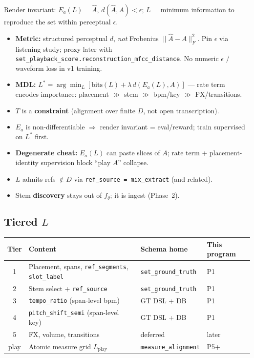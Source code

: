 \documentclass[11pt,a4paper]{article}
\begin{document}
\noindent Render invariant: $E_a(L)=\hat{A}$, $d(\hat{A},A)<\epsilon$; $L$ = minimum
information to reproduce the set within perceptual $\epsilon$.

\begin{itemize}[noitemsep]
  \item \textbf{Metric:} structured perceptual $d$, \emph{not} Frobenius
        $\|\hat{A}-A\|_F^2$. Pin $\epsilon$ via listening study; proxy later with
        \texttt{set\_playback\_score.reconstruction\_mfcc\_distance}. No numeric
        $\epsilon$ / waveform loss in v1 training.
  \item \textbf{MDL:}
        $L^*=\arg\min_L[\mathrm{bits}(L)+\lambda\,d(E_a(L),A)]$ --- rate term encodes
        importance: placement $\gg$ stem $\gg$ bpm/key $\gg$ FX/transitions.
  \item $T$ is a \textbf{constraint} (alignment over finite $D$, not open transcription).
  \item $E_a$ is non-differentiable $\Rightarrow$ render invariant = eval/reward; train
        supervised on $L^*$ first.
  \item \textbf{Degenerate cheat:} $E_a(L)$ can paste slices of $A$; rate term +
        placement-identity supervision block ``play $A$'' collapse.
  \item $L$ admits refs $\notin D$ via \texttt{ref\_source = mix\_extract} (and related).
  \item Stem \textbf{discovery} stays out of $f_\theta$; it is ingest (Phase~2).
\end{itemize}

\subsection{Tiered $L$}

\begin{center}
\begin{tabular}{@{}clll@{}}
\toprule
Tier & Content & Schema home & This program \\
\midrule
1 & Placement, spans, \texttt{ref\_segments}, \texttt{slot\_label} & \texttt{set\_ground\_truth} & P1 \\
2 & Stem select + \texttt{ref\_source} & \texttt{set\_ground\_truth} & P1 \\
3 & \texttt{tempo\_ratio} (span-level bpm) & GT DSL + DB & P1 \\
4 & \texttt{pitch\_shift\_semi} (span-level key) & GT DSL + DB & P1 \\
5 & FX, volume, transitions & deferred & later \\
play & Atomic measure grid $L_{\mathrm{play}}$ & \texttt{measure\_alignment} & P5+ \\
\bottomrule
\end{tabular}
\end{center}
\end{document}
